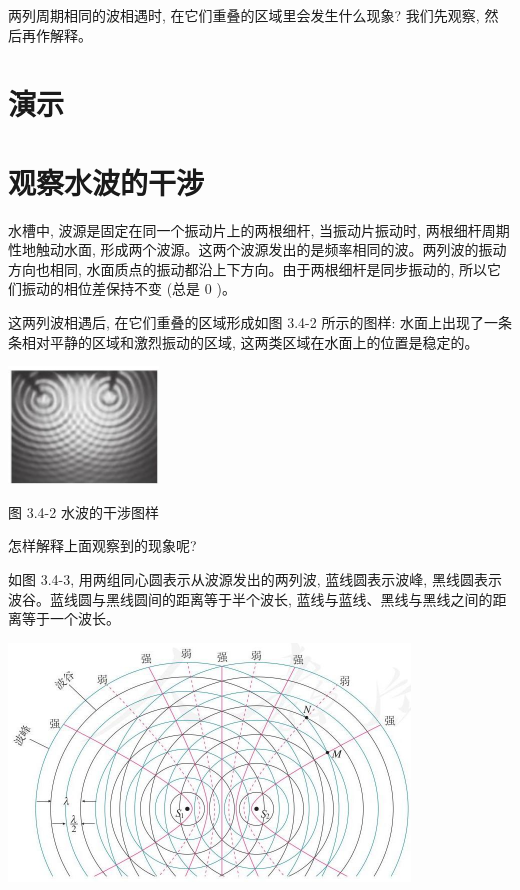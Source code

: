 \documentclass[10pt]{article}
\begin{document}
两列周期相同的波相遇时, 在它们重叠的区域里会发生什么现象? 我们先观察, 然后再作解释。

\section*{演示}

\section*{观察水波的干涉}

水槽中, 波源是固定在同一个振动片上的两根细杆, 当振动片振动时, 两根细杆周期性地触动水面, 形成两个波源。这两个波源发出的是频率相同的波。两列波的振动方向也相同, 水面质点的振动都沿上下方向。由于两根细杆是同步振动的, 所以它们振动的相位差保持不变 (总是 0 )。

这两列波相遇后, 在它们重叠的区域形成如图 3.4-2 所示的图样: 水面上出现了一条条相对平静的区域和激烈振动的区域, 这两类区域在水面上的位置是稳定的。

\begin{center}
\includegraphics[max width=0.3\textwidth]{images/01910e4c-ebb8-7d2c-8f2f-2375bc1d2d12_80_443295.jpg}
\end{center}

图 3.4-2 水波的干涉图样

怎样解释上面观察到的现象呢?

如图 3.4-3, 用两组同心圆表示从波源发出的两列波, 蓝线圆表示波峰, 黑线圆表示波谷。蓝线圆与黑线圆间的距离等于半个波长, 蓝线与蓝线、黑线与黑线之间的距离等于一个波长。

\begin{center}
\includegraphics[max width=0.8\textwidth]{images/01910e4c-ebb8-7d2c-8f2f-2375bc1d2d12_80_130609.jpg}
\end{center}
\end{document}
